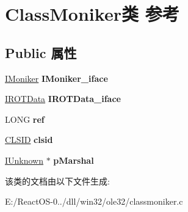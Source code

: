 \hypertarget{struct_class_moniker}{}\section{Class\+Moniker类 参考}
\label{struct_class_moniker}
\subsection*{Public 属性}
\begin{DoxyCompactItemize}
\item 
\mbox{\label{struct_class_moniker_a54ff2e131f28c7dbc37ffca5505669e9}} 
\hyperlink{interface_i_moniker}{I\+Moniker} {\bfseries I\+Moniker\+\_\+iface}
\item 
\mbox{\label{struct_class_moniker_a8039b1071e3a3093746f470b12ef3db7}} 
\hyperlink{interface_i_r_o_t_data}{I\+R\+O\+T\+Data} {\bfseries I\+R\+O\+T\+Data\+\_\+iface}
\item 
\mbox{\label{struct_class_moniker_a2a4a5f45cb0c604d73e58b8bfc1b1e06}} 
L\+O\+NG {\bfseries ref}
\item 
\mbox{\label{struct_class_moniker_a6311a74fe80740331dcfdcf714df60be}} 
\hyperlink{struct___i_i_d}{C\+L\+S\+ID} {\bfseries clsid}
\item 
\mbox{\label{struct_class_moniker_adcf231341a678a7f10edc500a4c33344}} 
\hyperlink{interface_i_unknown}{I\+Unknown} $\ast$ {\bfseries p\+Marshal}
\end{DoxyCompactItemize}


该类的文档由以下文件生成\+:\begin{DoxyCompactItemize}
\item 
E\+:/\+React\+O\+S-\/0../dll/win32/ole32/classmoniker.\+c\end{DoxyCompactItemize}
